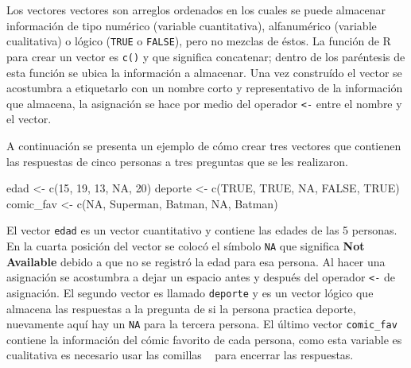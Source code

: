 \documentclass[
]{book}
\makeatletter
\newenvironment{Shaded}{\begin{snugshade}}{\end{snugshade}}
\newcommand{\ConstantTok}[1]{\textcolor[rgb]{0.00,0.00,0.00}{#1}}
\newcommand{\DecValTok}[1]{\textcolor[rgb]{0.00,0.00,0.81}{#1}}
\newcommand{\FunctionTok}[1]{\textcolor[rgb]{0.00,0.00,0.00}{#1}}
\newcommand{\NormalTok}[1]{#1}
\newcommand{\OtherTok}[1]{\textcolor[rgb]{0.56,0.35,0.01}{#1}}
\newcommand{\StringTok}[1]{\textcolor[rgb]{0.31,0.60,0.02}{#1}}
\newenvironment{kframe}{%
\medskip{}
\setlength{\fboxsep}{.8em}
 \def\at@end@of@kframe{}%
 \ifinner\ifhmode%
  \def\at@end@of@kframe{\end{minipage}}%
  \begin{minipage}{\columnwidth}%
 \fi\fi%
 \def\FrameCommand##1{\hskip\@totalleftmargin \hskip-\fboxsep
 \colorbox{shadecolor}{##1}\hskip-\fboxsep
     \hskip-\linewidth \hskip-\@totalleftmargin \hskip\columnwidth}%
 \MakeFramed {\advance\hsize-\width
   \@totalleftmargin\z@ \linewidth\hsize
   \@setminipage}}%
 {\par\unskip\endMakeFramed%
 \at@end@of@kframe}
\renewenvironment{Shaded}{\begin{kframe}}{\end{kframe}}
\makeatother
\begin{document}
Los vectores vectores son arreglos ordenados en los cuales se puede almacenar información de tipo numérico (variable cuantitativa), alfanumérico (variable cualitativa) o lógico (\texttt{TRUE} o \texttt{FALSE}), pero no mezclas de éstos. La función de R para crear un vector es \texttt{c()} y que significa concatenar; dentro de los paréntesis de esta función se ubica la información a almacenar. Una vez construído el vector se acostumbra a etiquetarlo con un nombre corto y representativo de la información que almacena, la asignación se hace por medio del operador \texttt{\textless{}-} entre el nombre y el vector.

A continuación se presenta un ejemplo de cómo crear tres vectores que contienen las respuestas de cinco personas a tres preguntas que se les realizaron.

\begin{Shaded}
\begin{Highlighting}[]
\NormalTok{edad }\OtherTok{\textless{}{-}} \FunctionTok{c}\NormalTok{(}\DecValTok{15}\NormalTok{, }\DecValTok{19}\NormalTok{, }\DecValTok{13}\NormalTok{, }\ConstantTok{NA}\NormalTok{, }\DecValTok{20}\NormalTok{)}
\NormalTok{deporte }\OtherTok{\textless{}{-}} \FunctionTok{c}\NormalTok{(}\ConstantTok{TRUE}\NormalTok{, }\ConstantTok{TRUE}\NormalTok{, }\ConstantTok{NA}\NormalTok{, }\ConstantTok{FALSE}\NormalTok{, }\ConstantTok{TRUE}\NormalTok{)}
\NormalTok{comic\_fav }\OtherTok{\textless{}{-}} \FunctionTok{c}\NormalTok{(}\ConstantTok{NA}\NormalTok{, }\StringTok{\textquotesingle{}Superman\textquotesingle{}}\NormalTok{, }\StringTok{\textquotesingle{}Batman\textquotesingle{}}\NormalTok{, }\ConstantTok{NA}\NormalTok{, }\StringTok{\textquotesingle{}Batman\textquotesingle{}}\NormalTok{)}
\end{Highlighting}
\end{Shaded}

El vector \texttt{edad} es un vector cuantitativo y contiene las edades de las 5 personas. En la cuarta posición del vector se colocó el símbolo \texttt{NA} que significa \textbf{Not Available} debido a que no se registró la edad para esa persona. Al hacer una asignación se acostumbra a dejar un espacio antes y después del operador \texttt{\textless{}-} de asignación. El segundo vector es llamado \texttt{deporte} y es un vector lógico que almacena las respuestas a la pregunta de si la persona practica deporte, nuevamente aquí hay un \texttt{NA} para la tercera persona. El último vector \texttt{comic\_fav} contiene la información del cómic favorito de cada persona, como esta variable es cualitativa es necesario usar las comillas \texttt{\textquotesingle{}\ \textquotesingle{}} para encerrar las respuestas.
\end{document}
